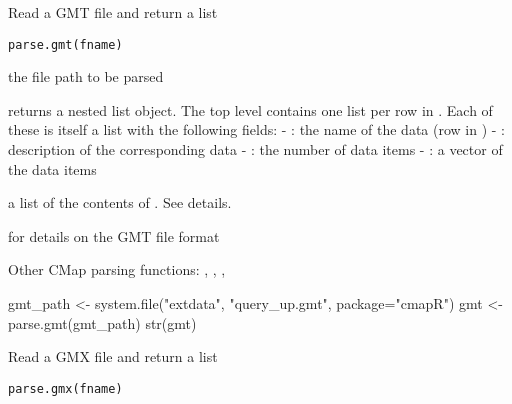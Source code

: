 \documentclass[letterpaper]{book}
\begin{document}
%
\begin{Description}\relax
Read a GMT file and return a list
\end{Description}
%
\begin{Usage}
\begin{verbatim}
parse.gmt(fname)
\end{verbatim}
\end{Usage}
%
\begin{Arguments}
\begin{ldescription}
\item[\code{fname}] the file path to be parsed
\end{ldescription}
\end{Arguments}
%
\begin{Details}\relax
{} returns a nested list object. The top
level contains one list per row in . Each of 
these is itself a list with the following fields:
- : the name of the data (row in )
- : description of the corresponding data
- : the number of data items
- : a vector of the data items
\end{Details}
%
\begin{Value}
a list of the contents of . See details.
\end{Value}
%
\begin{SeeAlso}\relax
{} for details on the GMT file format

Other CMap parsing functions: ,
, ,
\end{SeeAlso}
%
\begin{Examples}
\begin{ExampleCode}
gmt_path <- system.file("extdata", "query_up.gmt", package="cmapR")
gmt <- parse.gmt(gmt_path)
str(gmt)

\end{ExampleCode}
\end{Examples}
%
\begin{Description}\relax
Read a GMX file and return a list
\end{Description}
%
\begin{Usage}
\begin{verbatim}
parse.gmx(fname)
\end{verbatim}
\end{Usage}
\end{document}
